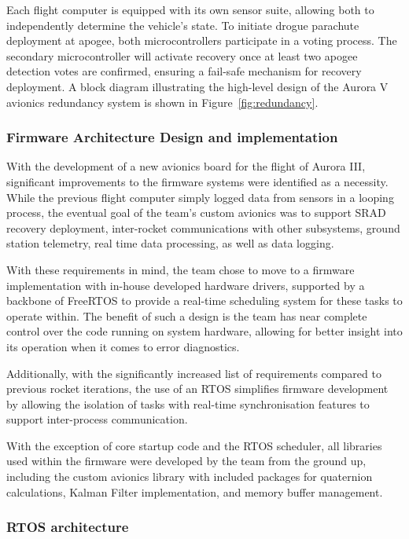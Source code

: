 Each flight computer is equipped with its own sensor suite, allowing both to independently determine the vehicle’s state. To initiate drogue parachute deployment at apogee, both microcontrollers participate in a voting process. The secondary microcontroller will activate recovery once at least two apogee detection votes are confirmed, ensuring a fail-safe mechanism for recovery deployment. A block diagram illustrating the high-level design of the Aurora V avionics redundancy system is shown in Figure~\ref{fig:redundancy}.

\subsubsection{Firmware Architecture Design and implementation}

With the development of a new avionics board for the flight of Aurora III, significant improvements to the firmware systems were identified as a necessity. While the previous flight computer simply logged data from sensors in a looping process, the eventual goal of the team's custom avionics was to support SRAD recovery deployment, inter-rocket communications with other subsystems, ground station telemetry, real time data processing, as well as data logging.

With these requirements in mind, the team chose to move to a firmware implementation with in-house developed hardware drivers, supported by a backbone of FreeRTOS to provide a real-time scheduling system for these tasks to operate within. The benefit of such a design is the team has near complete control over the code running on system hardware, allowing for better insight into its operation when it comes to error diagnostics. 

Additionally, with the significantly increased list of requirements compared to previous rocket iterations, the use of an RTOS simplifies firmware development by allowing the isolation of tasks with real-time synchronisation features to support inter-process communication.

With the exception of core startup code and the RTOS scheduler, all libraries used within the firmware were developed by the team from the ground up, including the custom avionics library with included packages for quaternion calculations, Kalman Filter implementation, and memory buffer management.

\subsubsection*{\hspace{4.2em}RTOS architecture}

